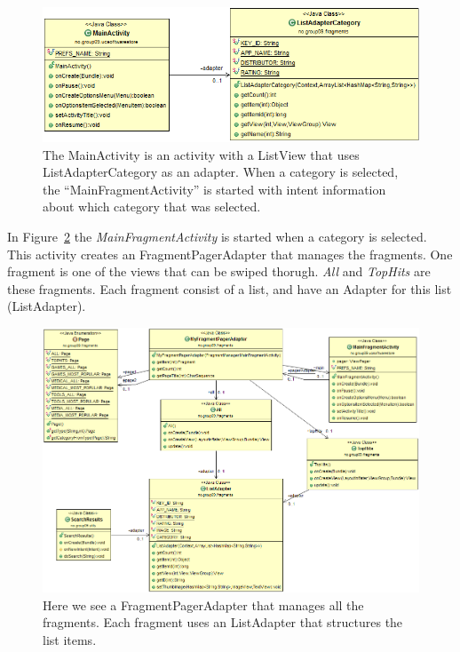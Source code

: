 	\begin{figure}[H]
	\centering
	\includegraphics[scale=0.85]{images/UML/categories.png}
	\caption[UML - Categories]{The MainActivity is an activity with a ListView that uses ListAdapterCategory as an adapter. When a category is selected, the ``MainFragmentActivity'' is started with intent information about which category that was selected.}
	\label{fig:categoriesuml}
	\end{figure}

	In Figure~\ref{fig:maingui} the \textit{MainFragmentActivity} is started when a category is selected. This activity creates an FragmentPagerAdapter that manages the fragments. One fragment is one of the views that can be swiped thorugh. \textit{All} and \textit{TopHits} are these fragments. Each fragment consist of a list, and have an Adapter for this list (ListAdapter).

	\begin{figure}[H]
	\hspace*{-1.0in}
	\includegraphics[scale=0.55]{images/UML/main.png}
	\caption[UML - Main GUI]{Here we see a FragmentPagerAdapter that manages all the fragments. Each fragment uses an ListAdapter that structures the list items.}
	\label{fig:maingui}
	\end{figure}

